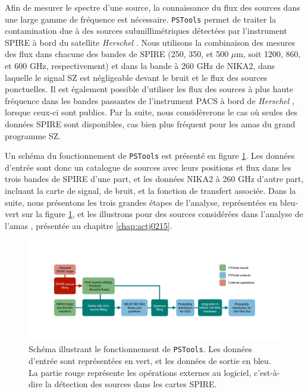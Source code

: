 Afin de mesurer le spectre d'une source, la connaissance du flux des sources dans une large gamme de fréquence est nécessaire.
\texttt{PSTools} permet de traiter la contamination due à des sources submillimétriques détectées par l'instrument SPIRE à bord du satellite \textit{Herschel} \cite{griffin_herschel-spire_2010}.
Nous utilisons la combinaison des mesures des flux dans chacune des bandes de SPIRE (250, 350, et 500 $\mu$m, soit 1200, 860, et 600 GHz, respectivement) et dans la bande à 260 GHz de NIKA2, dans laquelle le signal SZ est négligeable devant le bruit et le flux des sources ponctuelles.
Il est également possible d'utiliser les flux des sources à plus haute fréquence dans les bandes passantes de l'instrument PACS à bord de \textit{Herschel} \cite{poglitsch_photodetector_2010}, lorsque ceux-ci sont publics.
Par la suite, nous considèrerons le cas où seules des données SPIRE sont disponibles, cas bien plus fréquent pour les amas du grand programme SZ.

Un schéma du fonctionnement de \texttt{PSTools} est présenté en figure \ref{fig:pstools_schema}.
Les données d'entrée sont donc un catalogue de sources avec leurs positions et flux dans les trois bandes de SPIRE d'une part, et les données NIKA2 à 260 GHz d'autre part, incluant la carte de signal, de bruit, et la fonction de transfert associée.
Dans la suite, nous présentons les trois grandes étapes de l'analyse, représentées en bleu-vert sur la figure \ref{fig:pstools_schema}, et les illustrons pour des sources considérées dans l'analyse de l'amas \act, présentée au chapitre \ref{chap:actj0215}.

\begin{figure}[t]
    \centering
    \includegraphics[width=\linewidth, trim={8cm, 7cm, 8cm, 7cm}, clip]{Figures/Chap_decor/PSTools.pdf}
    \caption{
        Schéma illustrant le fonctionnement de \texttt{PSTools}.
        Les données d'entrée sont représentées en vert, et les données de sortie en bleu.
        La partie rouge représente les opérations externes au logiciel, c'est-à-dire la détection des sources dans les cartes SPIRE.
    }
    \label{fig:pstools_schema}
\end{figure}

